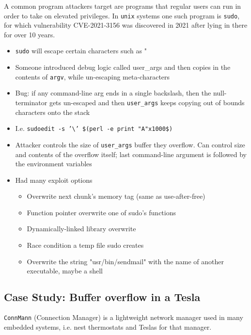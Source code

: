 \documentclass[../notes.tex]{subfiles}
\begin{document}
A common program attackers target are programs that regular users can run in order to take on elevated privileges.
In \texttt{unix} systems one such program is \texttt{sudo}, for which vulnerability CVE-2021-3156 was discovered in 2021 after lying in there for over 10 years.


\begin{itemize}
    \item \texttt{sudo} will escape certain characters such as "
    \item Someone introduced debug logic called user\_args and then copies in the contents of \texttt{argv}, while un-escaping meta-characters
    \item Bug: if any command-line arg ends in a single backslash, then the null-terminator gets un-escaped and then \texttt{user\_args} keeps copying out of bounds characters onto the stack
    \item I.e. \texttt{sudoedit -s '\textbackslash' \$(perl -e print "A"x1000\$)}
    \item Attacker controls the size of \texttt{user\_args} buffer they overflow. Can control size and contents of the overflow itself; last command-line argument is followed by the environment variables
    \item  Had many exploit options
        \begin{itemize}
            \item Overwrite next chunk's memory tag (same as use-after-free)
            \item Function pointer overwrite one of sudo's functions
            \item Dynamically-linked library overwrite
            \item Race condition a temp file sudo creates
            \item Overwrite the string "usr/bin/sendmail" with the name of another executable, maybe a shell
        \end{itemize}
\end{itemize}


\subsection{Case Study: Buffer overflow in a Tesla}

\texttt{ConnMann} (Connection Manager) is a lightweight network manager used in many embedded systems, i.e. nest thermostats and Teslas for that manager.
\end{document}
